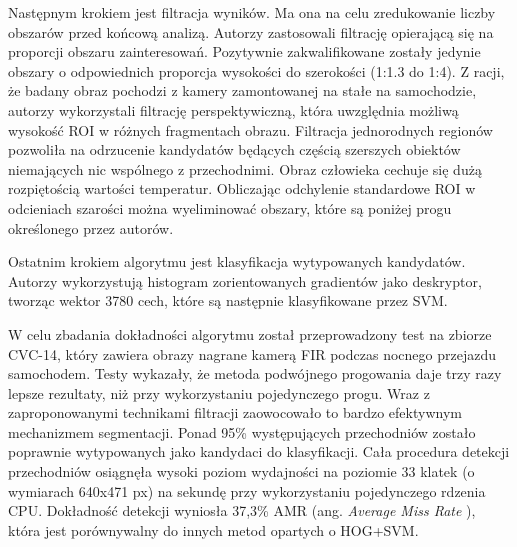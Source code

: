 Następnym krokiem jest filtracja wyników.
Ma ona na celu zredukowanie liczby obszarów przed końcową analizą.
Autorzy zastosowali filtrację opierającą się na proporcji obszaru zainteresowań.
Pozytywnie zakwalifikowane zostały jedynie obszary o odpowiednich proporcja wysokości do szerokości (1:1.3 do 1:4).
Z racji, że badany obraz pochodzi z kamery zamontowanej na stałe na samochodzie, autorzy wykorzystali filtrację perspektywiczną, która uwzględnia możliwą wysokość ROI w różnych fragmentach obrazu. %
Filtracja jednorodnych regionów pozwoliła na odrzucenie kandydatów będących częścią szerszych obiektów niemających nic wspólnego z przechodnimi. Obraz człowieka cechuje się dużą rozpiętością wartości temperatur. Obliczając odchylenie standardowe ROI w odcieniach szarości można wyeliminować obszary, które są poniżej progu określonego przez autorów. %

Ostatnim krokiem algorytmu jest klasyfikacja wytypowanych kandydatów.
Autorzy wykorzystują histogram zorientowanych gradientów jako deskryptor, tworząc wektor 3780 cech, które są następnie klasyfikowane przez SVM.

W celu zbadania dokładności algorytmu został przeprowadzony test na zbiorze CVC-14, który zawiera obrazy nagrane kamerą FIR podczas nocnego przejazdu samochodem.
Testy wykazały, że metoda podwójnego progowania daje trzy razy lepsze rezultaty, niż przy wykorzystaniu pojedynczego progu. Wraz z zaproponowanymi technikami filtracji zaowocowało to bardzo efektywnym mechanizmem segmentacji. Ponad 95\% występujących przechodniów zostało poprawnie wytypowanych jako kandydaci do klasyfikacji.
Cała procedura detekcji przechodniów osiągnęła wysoki poziom wydajności na poziomie 33 klatek (o wymiarach 640x471 px) na sekundę przy wykorzystaniu pojedynczego rdzenia CPU. Dokładność detekcji wyniosła 37,3\% AMR
(ang. \textit{ Average Miss Rate }), która jest porównywalny do innych metod opartych o HOG+SVM.

